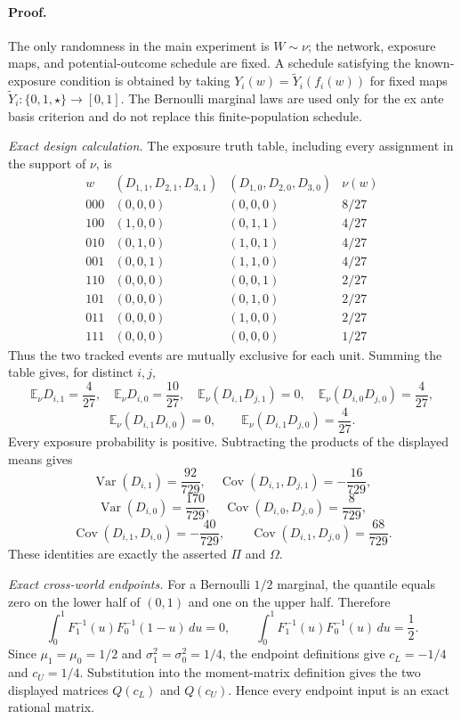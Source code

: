 \paragraph{Proof.}
The only randomness in the main experiment is \(W\sim\nu\); the network, exposure maps, and potential-outcome schedule are fixed.  A schedule satisfying the known-exposure condition is obtained by taking \(Y_i(w)=\widetilde Y_i(f_i(w))\) for fixed maps \(\widetilde Y_i:\{0,1,\star\}\to[0,1]\).  The Bernoulli marginal laws are used only for the ex ante basis criterion and do not replace this finite-population schedule.

\emph{Exact design calculation.}
The exposure truth table, including every assignment in the support of \(\nu\), is
\[
\begin{array}{c|c|c|c}
w&(D_{1,1},D_{2,1},D_{3,1})&(D_{1,0},D_{2,0},D_{3,0})&\nu(w)\\ \hline
000&(0,0,0)&(0,0,0)&8/27\\
100&(1,0,0)&(0,1,1)&4/27\\
010&(0,1,0)&(1,0,1)&4/27\\
001&(0,0,1)&(1,1,0)&4/27\\
110&(0,0,0)&(0,0,1)&2/27\\
101&(0,0,0)&(0,1,0)&2/27\\
011&(0,0,0)&(1,0,0)&2/27\\
111&(0,0,0)&(0,0,0)&1/27
\end{array}
\]
Thus the two tracked events are mutually exclusive for each unit.  Summing the table gives, for distinct \(i,j\),
\[
\mathbb E_\nu D_{i,1}=\frac4{27},
\quad
\mathbb E_\nu D_{i,0}=\frac{10}{27},
\quad
\mathbb E_\nu(D_{i,1}D_{j,1})=0,
\quad
\mathbb E_\nu(D_{i,0}D_{j,0})=\frac4{27},
\]
\[
\mathbb E_\nu(D_{i,1}D_{i,0})=0,
\qquad
\mathbb E_\nu(D_{i,1}D_{j,0})=\frac4{27}.
\]
Every exposure probability is positive.  Subtracting the products of the displayed means gives
\[
\operatorname{Var}(D_{i,1})=\frac{92}{729},
\quad
\operatorname{Cov}(D_{i,1},D_{j,1})=-\frac{16}{729},
\]
\[
\operatorname{Var}(D_{i,0})=\frac{170}{729},
\quad
\operatorname{Cov}(D_{i,0},D_{j,0})=\frac8{729},
\]
\[
\operatorname{Cov}(D_{i,1},D_{i,0})=-\frac{40}{729},
\qquad
\operatorname{Cov}(D_{i,1},D_{j,0})=\frac{68}{729}.
\]
These identities are exactly the asserted \(\Pi\) and \(\Omega\).

\emph{Exact cross-world endpoints.}
For a Bernoulli \(1/2\) marginal, the quantile equals zero on the lower half of \((0,1)\) and one on the upper half.  Therefore
\[
\int_0^1F_1^{-1}(u)F_0^{-1}(1-u)\,du=0,
\qquad
\int_0^1F_1^{-1}(u)F_0^{-1}(u)\,du=\frac12.
\]
Since \(\mu_1=\mu_0=1/2\) and \(\sigma_1^2=\sigma_0^2=1/4\), the endpoint definitions give \(c_L=-1/4\) and \(c_U=1/4\).  Substitution into the moment-matrix definition gives the two displayed matrices \(Q(c_L)\) and \(Q(c_U)\).  Hence every endpoint input is an exact rational matrix.

